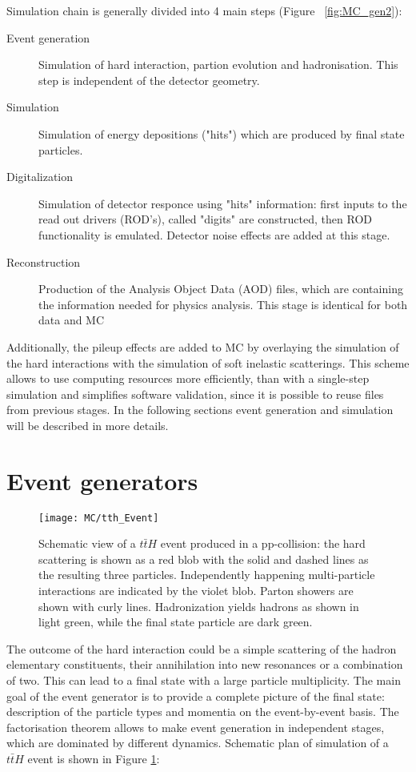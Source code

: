 Simulation chain is generally divided into 4 main steps (Figure ~\ref{fig:MC_gen2}):
\begin{description}
\item[Event generation]Simulation of hard interaction, partion evolution and hadronisation. This step is independent of the \atlas detector geometry.
\item[Simulation]Simulation of energy depositions ("hits") which are produced by final state particles.
\item[Digitalization] Simulation of detector responce using "hits" information:  first inputs to the read out drivers (ROD's), called "digits" are constructed, then ROD functionality is emulated. Detector noise effects are added at this stage. 
\item[Reconstruction] Production of the Analysis Object Data (AOD) files, which are containing the information needed for physics analysis. This stage is identical for both data and MC
\end{description}
Additionally, the pileup effects are added to MC by overlaying the simulation of the hard interactions with the simulation of soft inelastic scatterings. This scheme allows to use computing resources more efficiently, than with a single-step simulation and simplifies software validation, since it is possible to reuse files from previous stages. In the following sections event generation and simulation will be described in more details.

\section{Event generators}

\begin{figure}[!t]
\begin{center}
\texttt{[image: MC/tth\_Event]}
\end{center}
\caption{Schematic view of a $t\bar{t}H$ event produced in a pp-collision: the hard scattering is shown as a red blob with the solid and dashed lines as the resulting three particles.
Independently happening multi-particle interactions are indicated by the violet blob. 
Parton showers are shown with curly lines.
Hadronization yields hadrons as shown in light green, while the final state particle are dark green.\cite{MC:ttHSketch}
}
\label{fig:MC_ttH}
\end{figure}

The outcome of the hard interaction could be a simple scattering of the hadron elementary constituents, their annihilation into new resonances or a combination of two. This can lead to a final state with a large particle multiplicity. The main goal of the event generator is to provide a complete picture of the final state: description of the particle types and momentia on  the event-by-event basis. The factorisation theorem \cite{Factorisation} allows to make event generation in independent stages, which are dominated by different dynamics. Schematic plan of simulation of a $t\bar{t}H$ event is shown in Figure \ref{fig:MC_ttH}:

